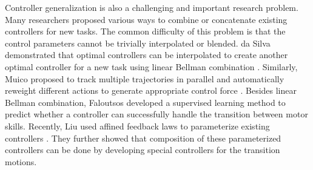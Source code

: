 
Controller generalization is also a challenging and important research
problem. Many researchers proposed various ways to combine or
concatenate existing controllers for new tasks. The common difficulty
of this problem is that the control parameters cannot be trivially
interpolated or blended. da Silva \etal demonstrated that optimal
controllers can be interpolated to create another optimal controller
for a new task using linear Bellman combination
\cite{daSilva:2009:LBC}. Similarly, Muico \etal proposed to track
multiple trajectories in parallel and automatically reweight different
actions to generate appropriate control force
\cite{Muico:2011:CCP}. Besides linear Bellman combination, Faloutsos
\etal {} developed a supervised learning
method to predict whether a controller can successfully handle the
transition between motor skills. Recently, Liu \etal used affined
feedback laws to parameterize existing controllers
\cite{Liu:2012:TRC}. They further showed that composition of these
parameterized controllers can be done by developing special
controllers for the transition motions.


